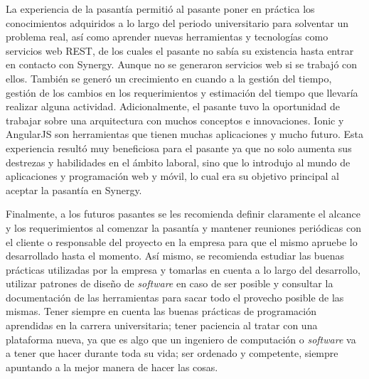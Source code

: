 La experiencia de la pasantía permitió al pasante poner en práctica los conocimientos adquiridos a lo largo del periodo universitario para solventar un problema real, así como aprender nuevas herramientas y tecnologías como servicios web REST, de los cuales el pasante no sabía su existencia hasta entrar en contacto con Synergy. Aunque no se generaron servicios web si se trabajó con ellos. También se generó un crecimiento en cuando a la gestión del tiempo, gestión de los cambios en los requerimientos y estimación del tiempo que llevaría realizar alguna actividad. Adicionalmente, el pasante tuvo la oportunidad de trabajar sobre una arquitectura con muchos conceptos e innovaciones. Ionic y AngularJS son herramientas que tienen muchas aplicaciones y mucho futuro. Esta experiencia resultó muy beneficiosa para el pasante ya que no solo aumenta sus destrezas y habilidades en el ámbito laboral, sino que lo introdujo al mundo de aplicaciones y programación web y móvil, lo cual era su objetivo principal al aceptar la pasantía en Synergy.

  
Finalmente, a los futuros pasantes se les recomienda definir claramente el alcance y los requerimientos al comenzar la pasantía y mantener reuniones periódicas con el cliente o responsable del proyecto en la empresa para que el mismo apruebe lo desarrollado hasta el momento. Así mismo, se recomienda estudiar las buenas prácticas utilizadas por la empresa y tomarlas en cuenta a lo largo del desarrollo, utilizar patrones de diseño de \textit{software} en caso de ser posible y consultar la documentación de las herramientas para sacar todo el provecho posible de las mismas. Tener siempre en cuenta las buenas prácticas de programación aprendidas en la carrera universitaria; tener paciencia al tratar con una plataforma nueva, ya que es algo que un ingeniero de computación o \textit{software} va a tener que hacer durante toda su vida; ser ordenado y competente, siempre apuntando a la mejor manera de hacer las cosas. 



